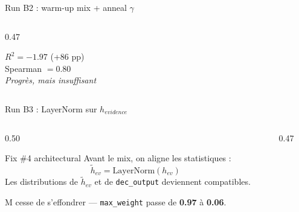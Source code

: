 \documentclass[10pt]{beamer}
\begin{document}
\begin{frame}{Run B2 : warm-up mix + anneal $\gamma$}
\begin{columns}
\begin{column}{0.47\textwidth}
      \vspace{6pt}
      \begin{verdictbox}
        \centering\small
        $R^2 = -1.97$ \quad (\textcolor{success}{+86 pp})\\
        Spearman $= 0.80$\\
        \textit{Progrès, mais insuffisant}
      \end{verdictbox}
    \end{column}
  \end{columns}
\end{frame}

\begin{frame}{Run B3 : LayerNorm sur $h_{evidence}$}
  \begin{columns}
    \begin{column}{0.50\textwidth}
      \begin{block}{Fix \#4 architectural}
        \footnotesize
        Avant le mix, on aligne les statistiques :
        \begin{equation*}
          \tilde h_{ev} = \mathrm{LayerNorm}(h_{ev})
        \end{equation*}
        Les distributions de $\tilde h_{ev}$ et de \texttt{dec\_output} deviennent compatibles.
      \end{block}

      \begin{interpbox}
        \footnotesize
        M cesse de s'effondrer --- \texttt{max\_weight} passe de \textbf{0.97} à \textbf{0.06}.
      \end{interpbox}
    \end{column}
    \begin{column}{0.47\textwidth}
\end{column}
\end{columns}
\end{frame}
\end{document}
